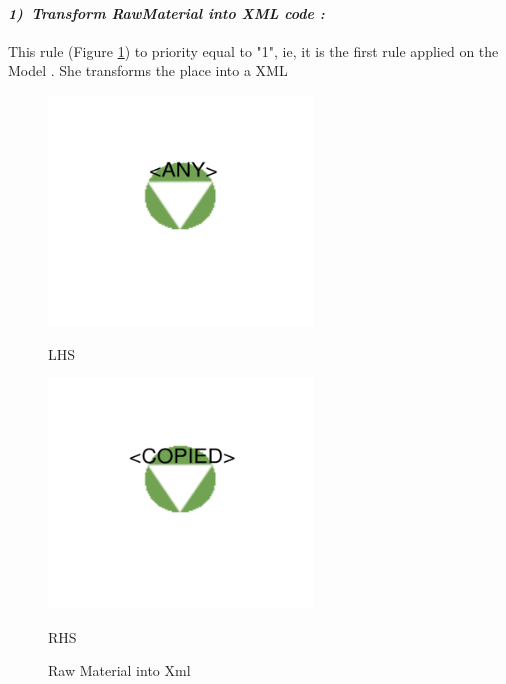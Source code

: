\paragraph{\emph{1)~Transform RawMaterial into XML code :} }
This rule (Figure \ref{fig:Raw Material into Xml}) to priority equal to "1", ie, 
it is the first rule applied on the Model . She transforms the place into a XML

\begin{figure}[th]
\centering
\begin{minipage}{.6\textwidth}
 
  \includegraphics[width=.7\linewidth]{Chapiter3/img/xL1}
  \linebreak

\hspace{2.5cm}  LHS
 
  
\end{minipage}%
\begin{minipage}{.6\textwidth}
 
  \includegraphics[width=.7\linewidth]{Chapiter3/img/xR1}
\linebreak  

\hspace{2.5cm}  RHS 
 
\end{minipage}
\caption{\label{fig:Raw Material into Xml}Raw Material into Xml} 

\end{figure} 

